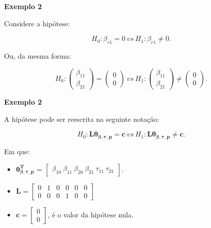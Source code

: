 \documentclass[10pt,
  aspectratio=169,
  serif,
  mathserif,
  professionalfont,
  compress,
  handout,
  ]{beamer}\usepackage[]{graphicx}\usepackage[]{color}
\begin{document}

\begin{frame}[c, allowframebreaks]

\textbf{Exemplo 2}

Considere a hipótese:

$$H_0: \beta_{r1} = 0 \ vs \ H_1: \beta_{r1} \neq 0.$$ 

Ou, da mesma forma:

$$H_0: 
\begin{pmatrix}
\beta_{11} \\ 
\beta_{21}
\end{pmatrix} 
= 
\begin{pmatrix}
0 \\ 
0
\end{pmatrix}
\ vs \ 
H_1: 
\begin{pmatrix}
\beta_{11} \\ 
\beta_{21}
\end{pmatrix} 
\neq
\begin{pmatrix}
0 \\ 
0 
\end{pmatrix}.$$

\end{frame}


\begin{frame}[c, allowframebreaks]

\textbf{Exemplo 2}

A hipótese pode ser reescrita na seguinte notação:

$$H_0: \boldsymbol{L}\boldsymbol{\theta_{\beta,\tau,p}} = \boldsymbol{c} \ vs \ H_1: \boldsymbol{L}\boldsymbol{\theta_{\beta,\tau,p}} \neq \boldsymbol{c}.$$ 

Em que:

\begin{itemize}
  
  \item $\boldsymbol{\theta_{\beta,\tau,p}^T}$ = $\begin{bmatrix} \beta_{10} \  \beta_{11} \ \beta_{20} \ \beta_{21} \ \tau_{11} \ \tau_{21} \end{bmatrix}$.


\item $\boldsymbol{L} = \begin{bmatrix} 0 & 1 & 0 & 0 & 0 & 0 \\
0 & 0 & 0 & 1 & 0 & 0 \end{bmatrix}$
 
\item $\boldsymbol{c} = \begin{bmatrix} 0 \\ 0 \end{bmatrix}$, é o valor da hipótese nula. 

\end{itemize}

\end{frame}
\end{document}
